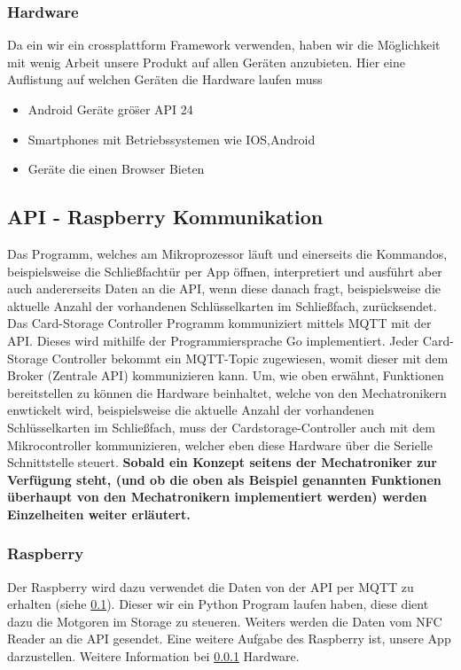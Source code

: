 \subsubsection{Hardware} \label{hardware}
Da ein wir ein crossplattform Framework verwenden, haben wir die M\"oglichkeit mit wenig Arbeit unsere Produkt auf allen Ger\"aten anzubieten. Hier eine Auflistung auf welchen Ger\"aten die Hardware laufen muss
\begin{itemize}
  \item Android Geräte grö\"ser API 24
  \item Smartphones mit Betriebssystemen wie IOS,Android
  \item Geräte die einen Browser Bieten
\end{itemize}

\newpage

\subsection{API - Raspberry Kommunikation} \label{api-raspi-communication}
Das Programm, welches am Mikroprozessor läuft und einerseits die Kommandos, beispielsweise die Schließfachtür per App öffnen, interpretiert und ausführt aber auch andererseits Daten an die API, wenn diese danach fragt, beispielsweise die aktuelle Anzahl der vorhandenen Schlüsselkarten im Schließfach, zurücksendet. Das Card-Storage Controller Programm kommuniziert mittels MQTT mit der API. Dieses wird mithilfe der Programmiersprache Go implementiert. Jeder Card-Storage Controller bekommt ein MQTT-Topic zugewiesen, womit dieser mit dem Broker (Zentrale API) kommunizieren kann. Um, wie oben erwähnt, Funktionen bereitstellen zu können die Hardware beinhaltet, welche von den Mechatronikern enwtickelt wird, beispielsweise die aktuelle Anzahl der vorhandenen Schlüsselkarten im Schließfach, muss der Cardstorage-Controller auch mit dem Mikrocontroller kommunizieren, welcher eben diese Hardware über die Serielle Schnittstelle steuert. \textbf{Sobald ein Konzept seitens der Mechatroniker zur Verfügung steht, (und ob die oben als Beispiel genannten Funktionen überhaupt von den Mechatronikern implementiert werden) werden Einzelheiten weiter erläutert.}

\subsubsection{Raspberry}
Der Raspberry wird dazu verwendet die Daten von der API per MQTT zu erhalten (siehe \ref{api-raspi-communication}). Dieser wir ein Python Program laufen haben, diese dient dazu die Motgoren im Storage  zu steueren. Weiters werden die Daten vom NFC Reader an die API gesendet. Eine weitere Aufgabe des Raspberry ist, unsere App darzustellen. Weitere Information bei \ref{hardware} Hardware.

